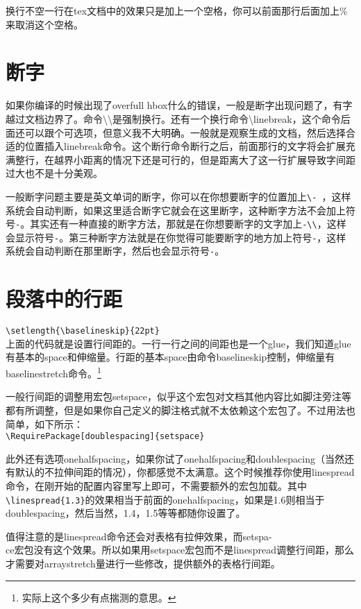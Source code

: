 \documentclass[11pt,oneside]{book}
\begin{document}
  换行不空一行在tex文档中的效果只是加上一个空格，你可以前面那行后面加上\%{}来取消这个空格。


  \section{断字}
  如果你编译的时候出现了overfull hbox什么的错误，一般是断字出现问题了，有字越过文档边界了。命令\textbackslash \textbackslash 是强制换行。还有一个换行命令\textbackslash linebreak，这个命令后面还可以跟个可选项，但意义我不大明确。一般就是观察生成的文档，然后选择合适的位置插入linebreak命令。这个断行命令断行之后，前面那行的文字将会扩展充满整行，在越界小距离的情况下还是可行的，但是距离大了这一行扩展导致字间距过大也不是十分美观。

  一般断字问题主要是英文单词的断字，你可以在你想要断字的位置加上\verb+\- +，这样系统会自动判断，如果这里适合断字它就会在这里断字，这种断字方法不会加上符号\verb+-+。其实还有一种直接的断字方法，那就是在你想要断字的文字加上\verb+-\\+，这样会显示符号\verb+-+。第三种断字方法就是在你觉得可能要断字的地方加上符号\verb+-+，这样系统会自动判断在那里断字，然后也会显示符号\verb+-+。



  \section[段落中的行距]{段落中的行距}
  \verb+\setlength{\baselineskip}{22pt}+\\
  上面的代码就是设置行间距的。一行一行之间的间距也是一个glue，我们知道glue有基本的space和伸缩量。行距的基本space由命令baselineskip控制，伸缩量有baselinestretch命令。\footnote{实际上这个多少有点揣测的意思。}

  一般行间距的调整用宏包setspace，似乎这个宏包对文档其他内容比如脚注旁注等都有所调整，但是如果你自己定义的脚注格式就不太依赖这个宏包了。不过用法也简单，如下所示：\\
  \verb+\RequirePackage[doublespacing]{setspace}+

  此外还有选项onehalfspacing，如果你试了onehalfspacing和doublespacing（当然还有默认的不拉伸间距的情况），你都感觉不太满意。这个时候推荐你使用linespread命令，在刚开始的配置内容里写上即可，不需要额外的宏包加载。其中\verb+\linespread{1.3}+的效果相当于前面的onehalfspacing，如果是1.6则相当于doublespacing，然后当然，1.4，1.5等等都随你设置了。

  \label{sec:段落中的行距}
  值得注意的是linespread命令还会对表格有拉伸效果，而setspa-\\ce宏包没有这个效果。所以如果用setspace宏包而不是linespread调整行间距，那么才需要对arraystretch量进行一些修改，提供额外的表格行间距。
\end{document}
